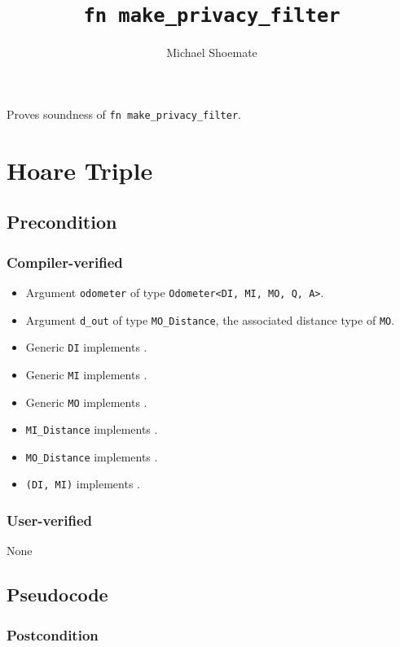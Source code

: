 \documentclass{article}
\title{\texttt{fn make\_privacy\_filter}}
\author{Michael Shoemate}
\date{}
\begin{document}
\maketitle

\contrib
Proves soundness of \texttt{fn make\_privacy\_filter}.

\section{Hoare Triple}
\subsection*{Precondition}
\subsubsection*{Compiler-verified}
\begin{itemize}
    \item Argument \texttt{odometer} of type \texttt{Odometer<DI, MI, MO, Q, A>}.
    \item Argument \texttt{d\_out} of type \texttt{MO\_Distance}, the associated distance type of \texttt{MO}.
    \item Generic \texttt{DI} implements .
    \item Generic \texttt{MI} implements .
    \item Generic \texttt{MO} implements .
    \item \texttt{MI\_Distance} implements .
    \item \texttt{MO\_Distance} implements .
    \item \texttt{(DI, MI)} implements .
\end{itemize}

\subsubsection*{User-verified}
None

\subsection*{Pseudocode}


\subsubsection*{Postcondition}
\end{document}
